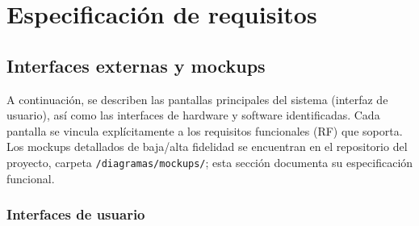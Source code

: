 \documentclass[11pt,a4paper]{article}
\begin{document}
	
	
	\section{ Especificación de requisitos}
	
	\subsection{ Interfaces externas y mockups}
	
	A continuación, se describen las pantallas principales del sistema (interfaz de usuario), así como las interfaces de hardware y software identificadas. Cada pantalla se vincula explícitamente a los requisitos funcionales (RF) que soporta. Los mockups detallados de baja/alta fidelidad se encuentran en el repositorio del proyecto, carpeta \texttt{/diagramas/mockups/}; esta sección documenta su especificación funcional.
	
	\subsubsection{ Interfaces de usuario}
	
	
	
\end{document}
